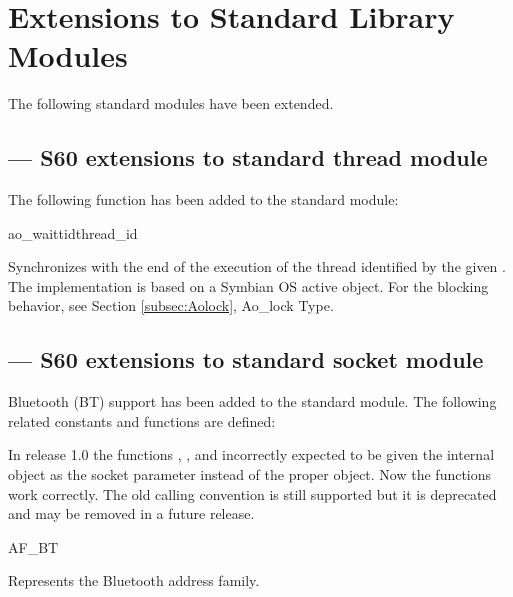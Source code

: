 
\section{Extensions to Standard Library Modules}
\label{extensions}

The following standard modules have been extended.

\subsection{ ---
  S60 extensions to standard thread module} 
\label{subsec:thread}


The following function has been added to the standard  
module:

\begin{funcdesc}{ao_waittid}{thread_id}

Synchronizes with the end of the execution of the thread identified by the given 
. The implementation is based on a Symbian OS active object. 
For the blocking behavior, see Section \ref{subsec:Aolock}, Ao_lock Type.

\end{funcdesc}

\subsection{ ---
  S60 extensions to standard socket module} 
\label{subsec:socket}


Bluetooth (BT) support has been added to the standard  
module. The following related constants and functions are defined:

\begin{notice}[note]
In release 1.0 the functions , 
, and 
 incorrectly 
expected to be given the internal  object as the 
socket parameter instead of the proper  object. Now the 
functions work correctly. The old calling convention is still supported but 
it is deprecated and may be removed in a future release.
\end{notice}

\begin{datadesc}{AF_BT}

Represents the Bluetooth address family.

\end{datadesc}

